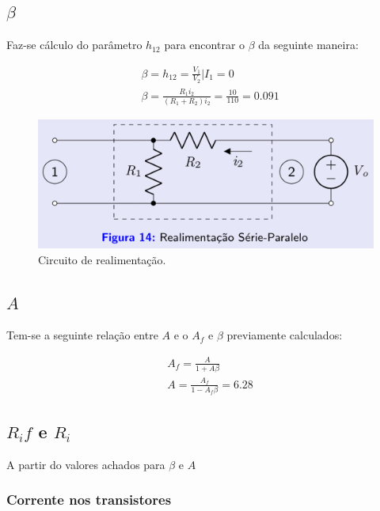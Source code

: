 \subsection{$\beta$}

Faz-se cálculo do parâmetro $h_{12}$ para encontrar o $\beta$ da seguinte maneira:

\begin{equation}
    \begin{aligned}
         & \beta = h_{12} = \frac{V_1}{V_2} | I_1 = 0                                    \\
         & \beta = \frac{R_1 i_2}{\left( R_1 + R_2 \right) i_2} = \frac{10}{110} = 0.091
    \end{aligned}
\end{equation}

\begin{figure}[h]
    \centering
    \includegraphics[width=0.5\columnwidth]{Images/realimentacao_beta.png}
    \caption{Circuito de realimentação.}
\end{figure}

\subsection{$A$}

Tem-se a seguinte relação entre $A$ e o $A_f$ e $\beta$ previamente calculados:

\begin{equation}
    \begin{aligned}
         & A_f = \frac{A}{1 + A\beta}           \\
         & A = \frac{A_f}{1 - A_f \beta} = 6.28
    \end{aligned}
\end{equation}

\subsection*{$R_if$ e $R_i$}

A partir do valores achados para $\beta$ e $A$





\subsubsection{Corrente nos transistores}

